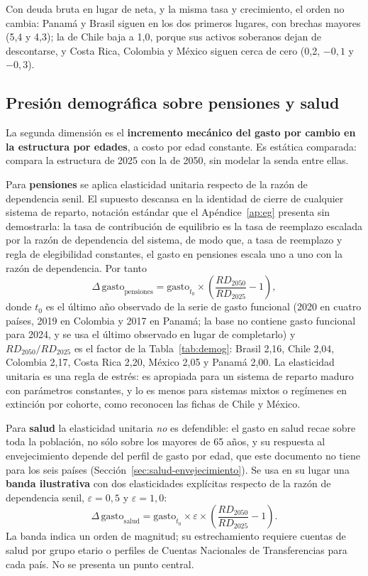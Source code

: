 \documentclass[12pt, letterpaper]{article}
\begin{document}
Con deuda bruta en lugar de neta, y la misma tasa y crecimiento, el orden no
cambia: Panamá y Brasil siguen en los dos primeros lugares, con brechas mayores
(5,4 y 4,3); la de Chile baja a 1,0, porque sus activos soberanos dejan de
descontarse, y Costa Rica, Colombia y México siguen cerca de cero (0,2, $-0{,}1$ y
$-0{,}3$).

\subsection{Presión demográfica sobre pensiones y salud}
\label{sec:presion}

La segunda dimensión es el \textbf{incremento mecánico del gasto por cambio en la
estructura por edades}, a costo por edad constante. Es estática comparada: compara
la estructura de 2025 con la de 2050, sin modelar la senda entre ellas.

Para \textbf{pensiones} se aplica elasticidad unitaria respecto de la razón de
dependencia senil. El supuesto descansa en la identidad de cierre de
cualquier sistema de reparto, notación estándar que el Apéndice~\ref{ap:eg}
presenta sin demostrarla: la
tasa de contribución de equilibrio es la tasa de reemplazo escalada por la razón de
dependencia del sistema, de modo que, a tasa de reemplazo y regla de elegibilidad
constantes, el gasto en pensiones escala uno a uno con la razón de dependencia. Por
tanto
\begin{equation}
  \Delta\,\text{gasto}_{\text{pensiones}}
  = \text{gasto}_{t_0} \times \left(\frac{RD_{2050}}{RD_{2025}} - 1\right),
  \label{eq:dpen}
\end{equation}
donde $t_0$ es el último año observado de la serie de gasto funcional (2020 en
cuatro países, 2019 en Colombia y 2017 en Panamá; la base no contiene gasto
funcional para 2024, y se usa el último observado en lugar de completarlo) y
$RD_{2050}/RD_{2025}$ es el factor de la Tabla~\ref{tab:demog}: Brasil 2,16, Chile
2,04, Colombia 2,17, Costa Rica 2,20, México 2,05 y Panamá 2,00. La elasticidad
unitaria es una regla de estrés: es apropiada para un sistema de reparto maduro con
parámetros constantes, y lo es menos para sistemas mixtos o regímenes en extinción
por cohorte, como reconocen las fichas de Chile y México.

Para \textbf{salud} la elasticidad unitaria \emph{no} es defendible: el gasto en
salud recae sobre toda la población, no sólo sobre los mayores de 65 años, y su
respuesta al envejecimiento depende del perfil de gasto por edad, que este
documento no tiene para los seis países (Sección~\ref{sec:salud-envejecimiento}).
Se usa en su lugar una \textbf{banda ilustrativa} con dos elasticidades
explícitas respecto de la razón de dependencia senil, $\varepsilon = 0{,}5$ y
$\varepsilon = 1{,}0$:
\begin{equation}
  \Delta\,\text{gasto}_{\text{salud}}
  = \text{gasto}_{t_0} \times \varepsilon \times
    \left(\frac{RD_{2050}}{RD_{2025}} - 1\right).
  \label{eq:dsal}
\end{equation}
La banda indica un orden de magnitud; su estrechamiento requiere cuentas de
salud por grupo etario o perfiles de Cuentas Nacionales de Transferencias para cada
país. No se presenta un punto central.
\end{document}
